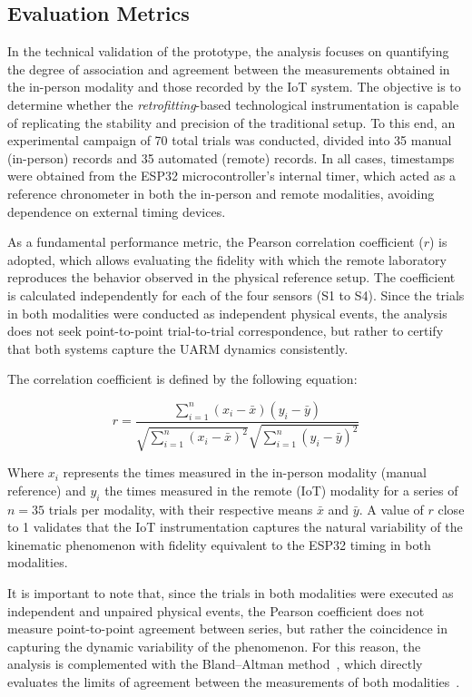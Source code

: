 \documentclass[sensors,article,submit,pdftex]{Definitions/mdpi}
\begin{document}
\subsection{Evaluation Metrics}

In the technical validation of the prototype, the analysis focuses on quantifying the degree of association and agreement between the measurements obtained in the in-person modality and those recorded by the IoT system. The objective is to determine whether the \textit{retrofitting}-based technological instrumentation is capable of replicating the stability and precision of the traditional setup. To this end, an experimental campaign of 70 total trials was conducted, divided into 35 manual (in-person) records and 35 automated (remote) records. In all cases, timestamps were obtained from the ESP32 microcontroller's internal timer, which acted as a reference chronometer in both the in-person and remote modalities, avoiding dependence on external timing devices.

As a fundamental performance metric, the Pearson correlation coefficient (\(r\)) is adopted, which allows evaluating the fidelity with which the remote laboratory reproduces the behavior observed in the physical reference setup. The coefficient is calculated independently for each of the four sensors (S1 to S4). Since the trials in both modalities were conducted as independent physical events, the analysis does not seek point-to-point trial-to-trial correspondence, but rather to certify that both systems capture the UARM dynamics consistently.

The correlation coefficient is defined by the following equation:

\begin{equation}
r = \frac{\sum_{i=1}^{n} (x_i - \bar{x})(y_i - \bar{y})}{\sqrt{\sum_{i=1}^{n} (x_i - \bar{x})^2} \sqrt{\sum_{i=1}^{n} (y_i - \bar{y})^2}}
\label{eq:pearson}
\end{equation}

Where \(x_i\) represents the times measured in the in-person modality (manual reference) and \(y_i\) the times measured in the remote (IoT) modality for a series of \(n=35\) trials per modality, with their respective means \(\bar{x}\) and \(\bar{y}\). A value of \(r\) close to 1 validates that the IoT instrumentation captures the natural variability of the kinematic phenomenon with fidelity equivalent to the ESP32 timing in both modalities.

It is important to note that, since the trials in both modalities were executed as independent and unpaired physical events, the Pearson coefficient does not measure point-to-point agreement between series, but rather the coincidence in capturing the dynamic variability of the phenomenon. For this reason, the analysis is complemented with the Bland--Altman method~\cite{bland1986}, which directly evaluates the limits of agreement between the measurements of both modalities~\cite{giavarina2015}.
\end{document}
